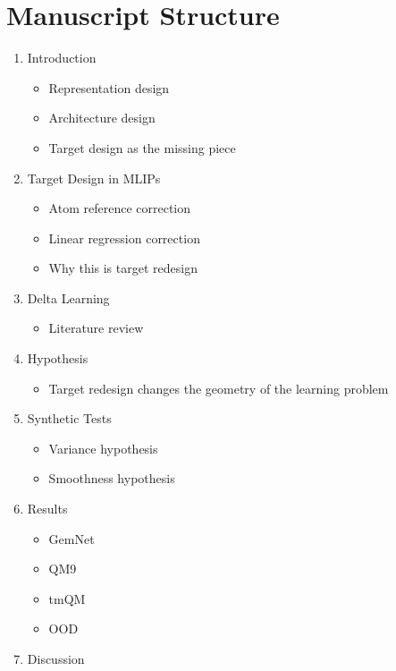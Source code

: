 \section*{Manuscript Structure}

\begin{enumerate}
  \item Introduction
  \begin{itemize}
    \item Representation design
    \item Architecture design
    \item Target design as the missing piece
  \end{itemize}
  \item Target Design in MLIPs
  \begin{itemize}
    \item Atom reference correction
    \item Linear regression correction
    \item Why this is target redesign
  \end{itemize}
  \item Delta Learning
  \begin{itemize}
    \item Literature review
  \end{itemize}
  \item Hypothesis
  \begin{itemize}
    \item Target redesign changes the geometry of the learning problem
  \end{itemize}
  \item Synthetic Tests
  \begin{itemize}
    \item Variance hypothesis
    \item Smoothness hypothesis
  \end{itemize}
  \item Results
  \begin{itemize}
    \item GemNet
    \item QM9
    \item tmQM
    \item OOD
  \end{itemize}
  \item Discussion
\end{enumerate}

